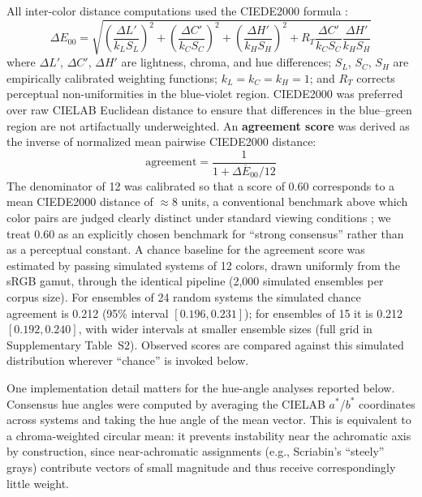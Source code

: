 \documentclass[12pt]{article}
\begin{document}
All inter-color distance computations used the CIEDE2000 formula
\citep{sharma2005}:
\begin{equation}
\Delta E_{00} = \sqrt{
  \left(\frac{\Delta L'}{k_L S_L}\right)^2 +
  \left(\frac{\Delta C'}{k_C S_C}\right)^2 +
  \left(\frac{\Delta H'}{k_H S_H}\right)^2 +
  R_T \frac{\Delta C'}{k_C S_C} \frac{\Delta H'}{k_H S_H}
}
\label{eq:ciede2000}
\end{equation}
where $\Delta L'$, $\Delta C'$, $\Delta H'$ are lightness, chroma, and
hue differences; $S_L$, $S_C$, $S_H$ are empirically calibrated
weighting functions; $k_L = k_C = k_H = 1$; and $R_T$ corrects
perceptual non-uniformities in the blue-violet region. CIEDE2000 was
preferred over raw CIELAB Euclidean distance to ensure that differences
in the blue--green region are not artifactually underweighted. An
\textbf{agreement score} was derived as the inverse of normalized mean
pairwise CIEDE2000 distance:
\begin{equation}
  \text{agreement} = \frac{1}{1 + \overline{\Delta E_{00}} / 12}
\label{eq:agreement}
\end{equation}
The denominator of 12 was calibrated so that a score of 0.60
corresponds to a mean CIEDE2000 distance of $\approx$8 units, a
conventional benchmark above which color pairs are judged clearly
distinct under standard viewing conditions \citep{sharma2005}; we
treat 0.60 as an explicitly chosen benchmark for ``strong consensus''
rather than as a perceptual constant. A chance baseline for the
agreement score was estimated by passing simulated systems of 12
colors, drawn uniformly from the sRGB gamut, through the identical
pipeline (2,000 simulated ensembles per corpus size). For ensembles of
24 random systems the simulated chance agreement is 0.212 (95\%
interval $[0.196, 0.231]$); for ensembles of 15 it is 0.212
$[0.192, 0.240]$, with wider intervals at smaller ensemble sizes
(full grid in Supplementary Table~S2). Observed scores are compared
against this simulated distribution wherever ``chance'' is invoked
below.

One implementation detail matters for the hue-angle analyses reported
below. Consensus hue angles were computed by averaging the CIELAB
$a^*$/$b^*$ coordinates across systems and taking the hue angle of the
mean vector. This is equivalent to a chroma-weighted circular mean: it
prevents instability near the achromatic axis by construction, since
near-achromatic assignments (e.g., Scriabin's ``steely'' grays)
contribute vectors of small magnitude and thus receive
correspondingly little weight.
\end{document}
